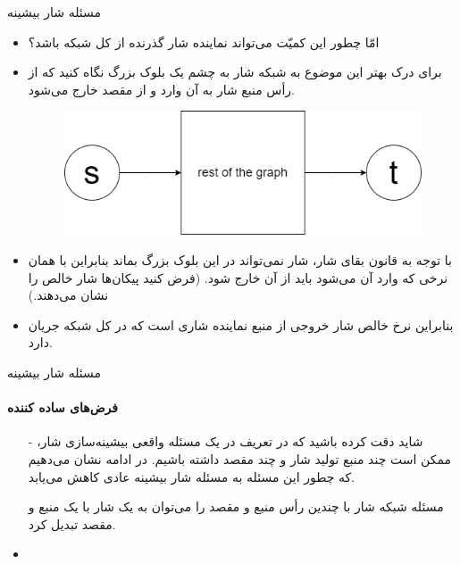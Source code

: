 

\begin{frame}{مسئله شار بیشینه}
\begin{itemize}\itemr
\item
امّا چطور این کمیّت می‌تواند نماینده شار گذرنده از کل شبکه باشد؟
\item
برای درک بهتر این موضوع به شبکه شار به چشم یک بلوک بزرگ نگاه کنید که از رأس منبع شار به آن وارد و از مقصد خارج می‌شود.

\begin{figure}[h!]
\centering
\includegraphics[width=.4\textwidth]{figs/chap01/6.png}
\end{figure}

\item
با توجه به قانون بقای شار، شار نمی‌تواند در این بلوک بزرگ بماند بنابراین با همان نرخی که وارد آن می‌شود باید از آن خارج شود. (فرض کنید پیکان‌ها شار خالص را نشان می‌دهند.)‌
\item
بنابراین نرخ خالص شار خروجی از منبع نماینده شاری است که در کل شبکه جریان دارد.
\end{itemize}
\end{frame}

\begin{frame}{مسئله شار بیشینه}
\framesubtitle{\quad فرض‌های ساده کننده}
\begin{itemize}\itemr
\item[-]
شاید دقت کرده باشید که در تعریف
در یک مسئله واقعی بیشینه‌سازی شار، ممکن است چند منبع تولید شار و چند مقصد داشته باشیم. در ادامه نشان می‌دهیم که چطور این مسئله به مسئله شار بیشینه عادی کاهش می‌یابد.

 مسئله شبکه شار با چندین رأس منبع و مقصد را می‌توان به یک شار با یک منبع و مقصد تبدیل کرد.

\item
\end{itemize}
\end{frame}
